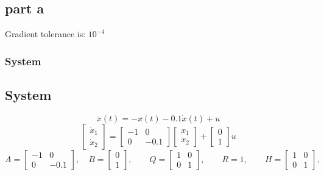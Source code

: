 \subsection{part a}
Gradient tolerance is: $10^{-4}$
\subsubsection{System}
\subsection{System}
$$
\ddot{x}(t) = -x(t) - 0.1\dot{x}(t) + u
$$
$$
\begin{bmatrix}
	\dot{x}_1\\
	\dot{x}_2
\end{bmatrix} = \begin{bmatrix}
	-1 & 0\\
	0 & -0.1
\end{bmatrix}\begin{bmatrix}
	{x}_1\\
	{x}_2
\end{bmatrix} +\begin{bmatrix}
	0\\1
\end{bmatrix}u
$$
$$
A = \begin{bmatrix}
	-1 & 0\\
	0 & -0.1
\end{bmatrix}, \quad B = \begin{bmatrix}
	0\\1
\end{bmatrix}, \qquad Q = \begin{bmatrix}
1 & 0\\
0 & 1
\end{bmatrix}, \qquad R = 1, \qquad H = \begin{bmatrix}
1 & 0\\
0 & 1
\end{bmatrix},
$$
